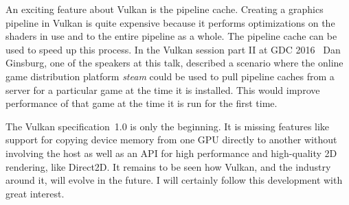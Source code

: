  An exciting feature about Vulkan is the pipeline cache.
  Creating a graphics pipeline in Vulkan is quite expensive because it performs optimizations on the shaders in use and to the entire pipeline as a whole.
  The pipeline cache can be used to speed up this process.
  In the Vulkan session part II at GDC 2016~\cite{vksessiongdc16} Dan Ginsburg, one of the speakers at this talk, described a scenario where the online game distribution platform \textit{steam} could be used to pull pipeline caches from a server for a particular game at the time it is installed.
  This would improve performance of that game at the time it is run for the first time.

  The Vulkan specification~1.0 is only the beginning.
  It is missing features like support for copying device memory from one GPU directly to another without involving the host as well as an API for high performance and high-quality 2D rendering, like Direct2D.
  It remains to be seen how Vulkan, and the industry around it, will evolve in the future.
  I will certainly follow this development with great interest.

